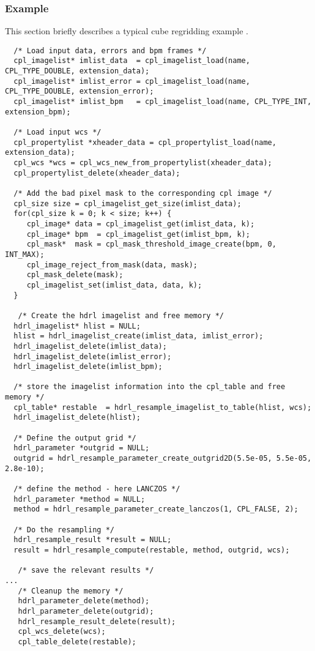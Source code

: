 \newpage
\subsubsection{Example}
\label{sec:algorithms:resampling:example}
This section briefly describes a typical cube regridding example .
{\footnotesize
  \begin{lstlisting}
  /* Load input data, errors and bpm frames */
  cpl_imagelist* imlist_data  = cpl_imagelist_load(name, CPL_TYPE_DOUBLE, extension_data);
  cpl_imagelist* imlist_error = cpl_imagelist_load(name, CPL_TYPE_DOUBLE, extension_error);
  cpl_imagelist* imlist_bpm   = cpl_imagelist_load(name, CPL_TYPE_INT, extension_bpm);
  
  /* Load input wcs */
  cpl_propertylist *xheader_data = cpl_propertylist_load(name, extension_data);
  cpl_wcs *wcs = cpl_wcs_new_from_propertylist(xheader_data);
  cpl_propertylist_delete(xheader_data);
  
  /* Add the bad pixel mask to the corresponding cpl image */
  cpl_size size = cpl_imagelist_get_size(imlist_data);
  for(cpl_size k = 0; k < size; k++) {
     cpl_image* data = cpl_imagelist_get(imlist_data, k);
     cpl_image* bpm  = cpl_imagelist_get(imlist_bpm, k);
     cpl_mask*  mask = cpl_mask_threshold_image_create(bpm, 0, INT_MAX);
     cpl_image_reject_from_mask(data, mask);
     cpl_mask_delete(mask);
     cpl_imagelist_set(imlist_data, data, k);
  }

   /* Create the hdrl imagelist and free memory */
  hdrl_imagelist* hlist = NULL;
  hlist = hdrl_imagelist_create(imlist_data, imlist_error);
  hdrl_imagelist_delete(imlist_data);
  hdrl_imagelist_delete(imlist_error);
  hdrl_imagelist_delete(imlist_bpm);
  
  /* store the imagelist information into the cpl_table and free memory */
  cpl_table* restable  = hdrl_resample_imagelist_to_table(hlist, wcs);
  hdrl_imagelist_delete(hlist);
  
  /* Define the output grid */
  hdrl_parameter *outgrid = NULL;
  outgrid = hdrl_resample_parameter_create_outgrid2D(5.5e-05, 5.5e-05, 2.8e-10);

  /* define the method - here LANCZOS */
  hdrl_parameter *method = NULL;
  method = hdrl_resample_parameter_create_lanczos(1, CPL_FALSE, 2);
  
  /* Do the resampling */
  hdrl_resample_result *result = NULL;
  result = hdrl_resample_compute(restable, method, outgrid, wcs);

   /* save the relevant results */
...
   /* Cleanup the memory */
   hdrl_parameter_delete(method);
   hdrl_parameter_delete(outgrid);
   hdrl_resample_result_delete(result);
   cpl_wcs_delete(wcs);
   cpl_table_delete(restable);
\end{lstlisting}
}


